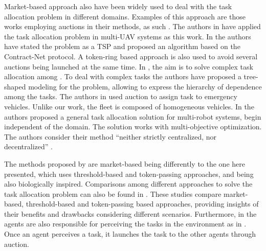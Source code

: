 Market-based approach also have been widely used to deal with the task allocation problem in different domains. Examples of this approach are those works employing auctions in their methods, as such  \cite{lemaire2004distributed,landen2010complex,ibri2012multi,tolmidis2013multi}. The authors in \cite{lemaire2004distributed,landen2010complex} have applied the task allocation problem in multi-UAV systems as this work. In \cite{lemaire2004distributed} the authors have stated the problem as a TSP and proposed an algorithm based on the Contract-Net protocol. A token-ring based approach is also used to avoid several auctions being launched at the same time. In \cite{landen2010complex}, the aim is to solve complex task allocation among \uavs. To deal with complex tasks the authors have proposed a tree-shaped modeling for the problem, allowing to express the hierarchy of dependence among the tasks. The authors in \cite{ibri2012multi} used auction to assign task to emergency vehicles. Unlike our work, the fleet is composed of homogeneous vehicles. In \cite{tolmidis2013multi} the authors proposed a general task allocation solution for multi-robot systems, begin independent of the domain. The solution works with multi-objective optimization. The authors consider their method ``neither strictly centralized, nor decentralized'' \cite{tolmidis2013multi}.

The methods proposed by \cite{lemaire2004distributed,landen2010complex,ibri2012multi,tolmidis2013multi} are market-based being differently to the one here presented, which uses threshold-based and token-passing approaches, and being also biologically inspired. Comparisons among different approaches to solve the task allocation problem can also be found in \cite{kalra2006comparative,xu2006comparing}. These studies compare market-based, threshold-based and token-passing based approaches, providing insights of their benefits and drawbacks considering different scenarios. Furthermore, in \cite{lemaire2004distributed,landen2010complex,tolmidis2013multi} the agents are also responsible for perceiving the tasks in the environment as in \cite{ferreira2007swarm,scerri2005allocatingLADCOP, ferreira2010robocup,ikemoto2010adaptive}. Once an agent perceives a task, it launches the task to the other agents through auction. 

